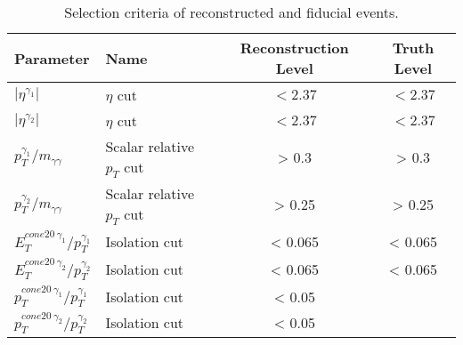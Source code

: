 \documentclass[a4paper, oneside, 11pt, openright]{book}
\begin{document}
 			\begin{table}[tbp]
 				\centering
					\begin{tabular}{llcc}
						\toprule[1.5pt]
						Parameter									& Name						& Reconstruction Level	& Truth Level		\\
						\midrule
						$|\eta^{\gamma_1}|$							& $\eta$ cut				& $<2.37$ 				& $<2.37$			\\
						$|\eta^{\gamma_2}|$							& $\eta$ cut				& $<2.37$ 				& $<2.37$			\\
						$p_T^{\gamma_1}/m_{\gamma\gamma}$			& Scalar relative $p_T$ cut & > 0.3					& > 0.3    			\\
						$p_T^{\gamma_2}/m_{\gamma\gamma}$			& Scalar relative $p_T$ cut & > 0.25				& > 0.25			\\
						$E_{T}^{cone20\ \gamma_1}/p_T^{\gamma_1}$ 	& Isolation cut 			& < 0.065				& < 0.065 			\\
						$E_{T}^{cone20\ \gamma_2}/p_T^{\gamma_2}$ 	& Isolation cut 			& < 0.065				& < 0.065			\\
						$p_{T}^{cone20\ \gamma_1}/p_T^{\gamma_1}$ 	& Isolation cut 			& < 0.05				& 		 			\\
						$p_{T}^{cone20\ \gamma_2}/p_T^{\gamma_2}$ 	& Isolation cut 			& < 0.05				& 					\\
						\bottomrule[1.5pt]
					\end{tabular}
 				\caption{Selection criteria of reconstructed and fiducial events.}
 				\label{tab:MC_sel}
 			\end{table}
 		
\end{document}
